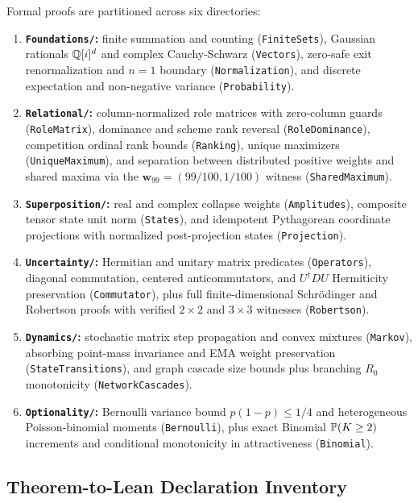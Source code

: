 \noindent\layermath{} \layerformal{} Formal proofs are partitioned across six directories:
\begin{enumerate}[nosep]
  \item \textbf{\texttt{Foundations/}:} finite summation and counting (\texttt{FiniteSets}),
        Gaussian rationals $\mathbb{Q}[i]^d$ and complex Cauchy-Schwarz (\texttt{Vectors}),
        zero-safe exit renormalization and $n=1$ boundary (\texttt{Normalization}), and
        discrete expectation and non-negative variance (\texttt{Probability}).
  \item \textbf{\texttt{Relational/}:} column-normalized role matrices with zero-column
        guards (\texttt{RoleMatrix}), dominance and scheme rank reversal (\texttt{RoleDominance}),
        competition ordinal rank bounds (\texttt{Ranking}), unique maximizers (\texttt{UniqueMaximum}),
        and separation between distributed positive weights and shared maxima via the
        $\mathbf{w}_{99} = (99/100, 1/100)$ witness (\texttt{SharedMaximum}).
  \item \textbf{\texttt{Superposition/}:} real and complex collapse weights (\texttt{Amplitudes}),
        composite tensor state unit norm (\texttt{States}), and idempotent Pythagorean
        coordinate projections with normalized post-projection states (\texttt{Projection}).
  \item \textbf{\texttt{Uncertainty/}:} Hermitian and unitary matrix predicates (\texttt{Operators}),
        diagonal commutation, centered anticommutators, and $U^\dagger D U$ Hermiticity preservation
        (\texttt{Commutator}), plus full finite-dimensional Schr\"odinger and Robertson proofs
        with verified $2\times 2$ and $3\times 3$ witnesses (\texttt{Robertson}).
  \item \textbf{\texttt{Dynamics/}:} stochastic matrix step propagation and convex mixtures
        (\texttt{Markov}), absorbing point-mass invariance and EMA weight preservation
        (\texttt{StateTransitions}), and graph cascade size bounds plus branching $R_0$
        monotonicity (\texttt{NetworkCascades}).
  \item \textbf{\texttt{Optionality/}:} Bernoulli variance bound $p(1-p)\le 1/4$ and
        heterogeneous Poisson-binomial moments (\texttt{Bernoulli}), plus exact Binomial
        $\mathbb{P}(K \ge 2)$ increments and conditional monotonicity in attractiveness (\texttt{Binomial}).
\end{enumerate}

\subsection{Theorem-to-Lean Declaration Inventory}
\label{subsec:ver-inventory}


